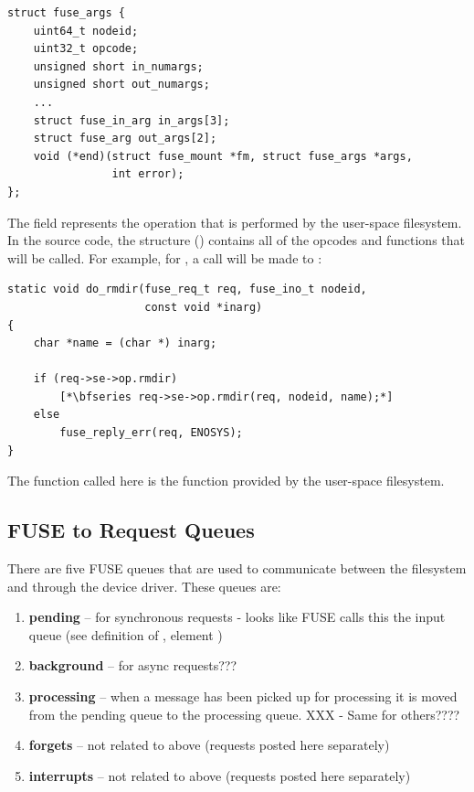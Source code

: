 \begin{lstlisting}
struct fuse_args {
    uint64_t nodeid;
    uint32_t opcode;
    unsigned short in_numargs;
    unsigned short out_numargs;
    ...
    struct fuse_in_arg in_args[3];
    struct fuse_arg out_args[2];
    void (*end)(struct fuse_mount *fm, struct fuse_args *args, 
                int error);
};
\end{lstlisting}

\noindent
The  field represents the operation that is performed by the user-space filesystem. In the  source code, the  structure () contains all of the opcodes and functions that will be called. For example, for , a call will be made to : 

\begin{lstlisting}
static void do_rmdir(fuse_req_t req, fuse_ino_t nodeid, 
                     const void *inarg)
{   
    char *name = (char *) inarg;       
    
    if (req->se->op.rmdir) 
        [*\bfseries req->se->op.rmdir(req, nodeid, name);*]
    else
        fuse_reply_err(req, ENOSYS);       
}   
\end{lstlisting}

\noindent
The  function called here is the function provided by the user-space filesystem.


\subsection{FUSE to  Request Queues}

There are five FUSE queues that are used to communicate between the  filesystem and  through the  device driver. These queues are:

\begin{enumerate}
	\item \textbf{pending} -- for synchronous requests - looks like FUSE calls this the input queue (see definition of 
		, element )
	\item \textbf{background} -- for async requests??? 
	\item \textbf{processing} -- when a message has been picked up for processing it is moved from the pending queue
		to the processing queue. XXX - Same for others????
	\item \textbf{forgets} -- not related to above (requests posted here separately)
	\item \textbf{interrupts} -- not related to above (requests posted here separately)
\end{enumerate}

